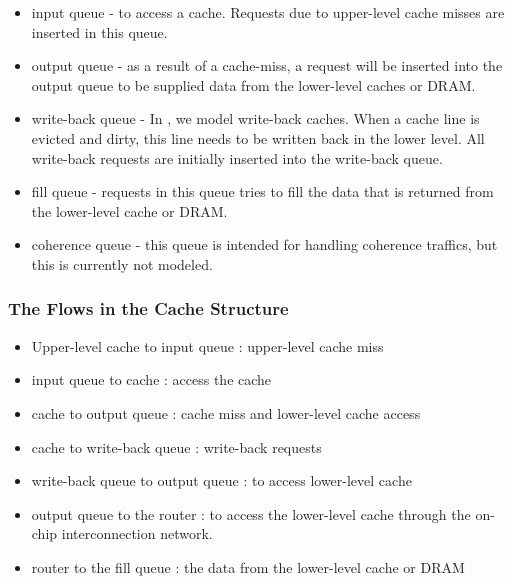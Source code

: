 \begin{itemize}
  \item input queue - to access a cache. Requests due to upper-level
  cache misses are inserted in this queue.

  \item output queue - as a result of a cache-miss, a request will be
  inserted into the output queue to be supplied data from the
  lower-level caches or DRAM.

  \item write-back queue - In \SIM, we model write-back caches. When a
  cache line is evicted and dirty, this line needs to be written back
  in the lower level. All write-back requests are initially inserted
  into the write-back queue.

  \item fill queue - requests in this queue tries to fill the data
  that is returned from the lower-level cache or DRAM.

  \item coherence queue - this queue is intended for handling
  coherence traffics, but this is currently not modeled.
\end{itemize}


\subsubsection{The Flows in the Cache Structure}
\label{sec:cache-flow}

\begin{itemize}

  \item Upper-level cache to input queue : upper-level cache miss

  \item input queue to cache : access the cache

  \item cache to output queue : cache miss and lower-level cache access

  \item cache to write-back queue : write-back requests

  \item write-back queue to output queue : to access lower-level cache

  \item output queue to the router : to access the lower-level cache
  through the on-chip interconnection network.

  \item router to the fill queue : the data from the lower-level cache
  or DRAM

\end{itemize}


